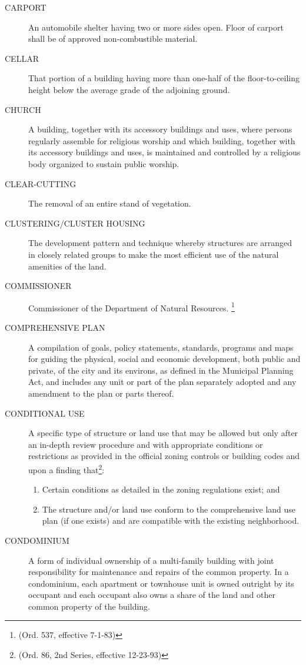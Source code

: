 \begin{description}
    \item[CARPORT] An automobile shelter having two or more sides open. Floor of carport shall be of approved non-combustible material.
    \item[CELLAR] That portion of a building having more than one-half of the floor-to-ceiling height below the average grade of the adjoining ground.
    \item[CHURCH]  A building, together with its accessory buildings and uses, where persons regularly assemble for religious worship and which building, together with its accessory buildings and uses, is maintained and controlled by a religious body organized to sustain public worship.
    \item[CLEAR-CUTTING] The removal of an entire stand of vegetation.
    \item[CLUSTERING/CLUSTER HOUSING] The development pattern and technique whereby structures are arranged in closely related groups to make the most efficient use of the natural amenities of the land.
    \item[COMMISSIONER] Commissioner of the Department of Natural Resources. \footnote{(Ord. 537, effective 7-1-83)}
    \item[COMPREHENSIVE PLAN] A compilation of goals, policy statements, standards, programs and maps for guiding the physical, social and economic development, both public and private, of the city and its environs, as defined in the Municipal Planning Act, and includes any unit or part of the plan separately adopted and any amendment to the plan or parts thereof.
    \item[CONDITIONAL USE] A specific type of structure or land use that may be allowed but only after an in-depth review procedure and with appropriate conditions or restrictions as provided in the official zoning controls or building codes and upon a finding that\footnote{(Ord. 86, 2nd Series, effective 12-23-93)}:
        \begin{enumerate}
            \item Certain conditions as detailed in the zoning regulations exist; and 
            \item The structure and/or land use conform to the comprehensive land use plan (if one exists) and are compatible with the existing neighborhood.
        \end{enumerate}
    \item[CONDOMINIUM] A form of individual ownership of a multi-family building with joint responsibility for maintenance and repairs of the common property.  In a condominium, each apartment or townhouse unit is owned outright by its occupant and each occupant also owns a share of the land and other common property of the building.

\end{description}
